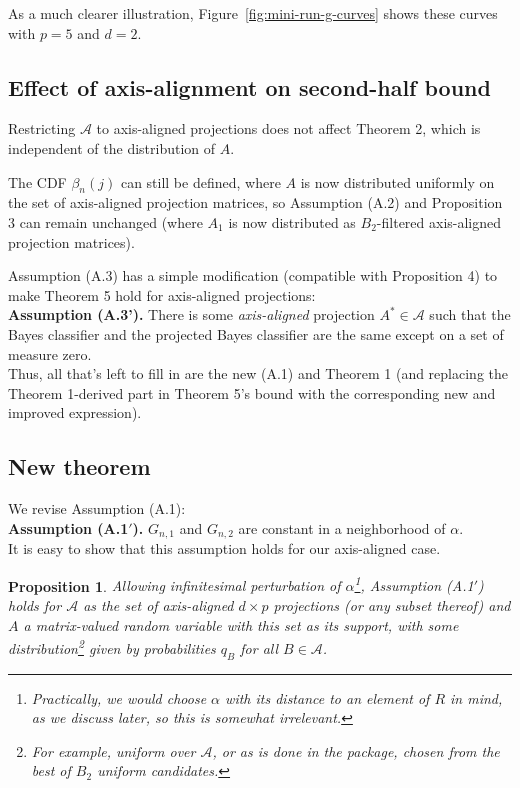 \documentclass[ejs,preprint]{imsart}
\newtheorem{proposition}{Proposition}
\begin{document}
As a much clearer illustration, Figure~\ref{fig:mini-run-g-curves} shows
these curves with $p=5$ and $d=2$.

\subsection{Effect of axis-alignment on second-half bound}

Restricting $\mathcal A$ to axis-aligned projections does not affect Theorem 2, which is independent of the distribution of $A$.

The CDF $\beta_{n}(j)$ can still be defined, where $A$ is now distributed
uniformly on the set of axis-aligned projection matrices, so Assumption
(A.2) and Proposition 3 can remain unchanged (where $A_{1}$ is now
distributed as $B_{2}$-filtered axis-aligned projection matrices).

Assumption (A.3) has a simple modification (compatible with Proposition
4) to make Theorem 5 hold for axis-aligned projections:\\


\noindent \textbf{Assumption (A.3').} There is some \emph{axis-aligned}
projection $A^{*}\in\mathcal{A}$ such that the Bayes classifier and
the projected Bayes classifier are the same except on a set of measure
zero.\\


Thus, all that's left to fill in are the new (A.1) and Theorem 1 (and
replacing the Theorem 1-derived part in Theorem 5's bound with the
corresponding new and improved expression).


\subsection{New theorem}

We revise Assumption (A.1):\\

\noindent \textbf{Assumption (A.1$'$).} $G_{n,1}$ and $G_{n,2}$ are
constant in a neighborhood of $\alpha$.\\

It is easy to show that this assumption holds for our axis-aligned
case.

\begin{proposition}
Allowing infinitesimal perturbation of $\alpha$\footnote{Practically, we would choose $\alpha$ with its distance to an element of $R$ in mind, as we discuss later, so this is somewhat irrelevant.}, Assumption (A.1$'$) holds for $\mathcal{A}$ as the set of axis-aligned
$d\times p$ projections (or any subset thereof) and $A$ a matrix-valued
random variable with this set as its support, with some distribution\footnote{For example, uniform over $\mathcal{A}$, or as is done in the package,
chosen from the best of $B_{2}$ uniform candidates.} given by probabilities $q_{B}$ for all $B\in\mathcal{A}$.
\end{proposition}
\end{document}
